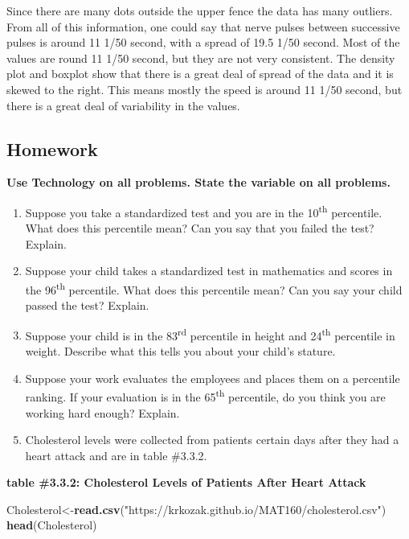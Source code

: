 \documentclass[
]{book}
\newenvironment{Shaded}{\begin{snugshade}}{\end{snugshade}}
\newcommand{\KeywordTok}[1]{\textcolor[rgb]{0.13,0.29,0.53}{\textbf{#1}}}
\newcommand{\NormalTok}[1]{#1}
\newcommand{\StringTok}[1]{\textcolor[rgb]{0.31,0.60,0.02}{#1}}
\begin{document}
Since there are many dots outside the upper fence the data has many outliers. From all of this information, one could say that nerve pulses between successive pulses is around 11 1/50 second, with a spread of 19.5 1/50 second. Most of the values are round 11 1/50 second, but they are not very consistent. The density plot and boxplot show that there is a great deal of spread of the data and it is skewed to the right. This means mostly the speed is around 11 1/50 second, but there is a great deal of variability in the values.

\hypertarget{homework-5}{%
\subsection{Homework}\label{homework-5}}

\textbf{Use Technology on all problems. State the variable on all problems.}

\begin{enumerate}
\def\labelenumi{\arabic{enumi}.}
\item
  Suppose you take a standardized test and you are in the 10\textsuperscript{th} percentile. What does this percentile mean? Can you say that you failed the test? Explain.
\item
  Suppose your child takes a standardized test in mathematics and scores in the 96\textsuperscript{th} percentile. What does this percentile mean? Can you say your child passed the test? Explain.
\item
  Suppose your child is in the 83\textsuperscript{rd} percentile in height and 24\textsuperscript{th} percentile in weight. Describe what this tells you about your child's stature.
\item
  Suppose your work evaluates the employees and places them on a percentile ranking. If your evaluation is in the 65\textsuperscript{th} percentile, do you think you are working hard enough? Explain.
\item
  Cholesterol levels were collected from patients certain days after they had a heart attack and are in table \#3.3.2.
\end{enumerate}

\textbf{table \#3.3.2: Cholesterol Levels of Patients After Heart Attack}

\begin{Shaded}
\begin{Highlighting}[]
\NormalTok{Cholesterol<-}\KeywordTok{read.csv}\NormalTok{(}\StringTok{"https://krkozak.github.io/MAT160/cholesterol.csv"}\NormalTok{)}
\KeywordTok{head}\NormalTok{(Cholesterol)}
\end{Highlighting}
\end{Shaded}
\end{document}
